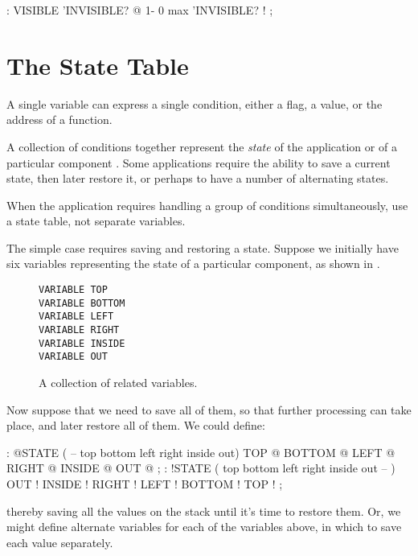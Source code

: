 \begin{Code}
: VISIBLE   'INVISIBLE? @  1-  0 max  'INVISIBLE? ! ;
\end{Code}
%

\section{The State Table}%

A single variable can express a single condition, either a flag, a value, or
the address of a function.

A collection of conditions together represent the \emph{state} of the
application or of a particular component \cite{slater83}. Some applications require the
ability to save a current state, then later restore it, or perhaps to have a
number of alternating states.

\begin{tip}
When the application requires handling a group of conditions
simultaneously, use a state table, not separate variables.
\end{tip}

\noindent The simple case requires saving and restoring a state. Suppose
we initially have six variables representing the state of a particular
component, as shown in .
\begin{figure*}[hhhh]
\caption{A collection of related variables.}
\begin{center}
\begin{BVerbatim}
VARIABLE TOP
VARIABLE BOTTOM
VARIABLE LEFT
VARIABLE RIGHT
VARIABLE INSIDE
VARIABLE OUT
\end{BVerbatim}
\end{center}
\end{figure*}

\noindent Now suppose that we need to save all of them, so that further
processing can take place, and later restore all of them. We could define:

\begin{Code}
: @STATE ( -- top bottom left right inside out)
   TOP @  BOTTOM @  LEFT @  RIGHT @  INSIDE @  OUT @ ;
: !STATE ( top bottom left right inside out -- )
   OUT !  INSIDE !  RIGHT !  LEFT !  BOTTOM !  TOP ! ;
\end{Code}
thereby saving all the values on the stack until it's time to restore them.
Or, we might define alternate variables for each of the variables above, in
which to save each value separately.

